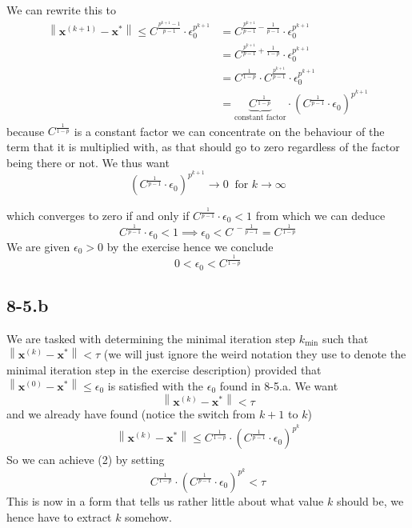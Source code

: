 \documentclass{article}
\newcommand\xk{\mathbf{x}^{\left(k\right)}}
\newcommand\xkn{\mathbf{x}^{\left(k+1\right)}}
\newcommand\xstar{\mathbf{x}^{*}}
\newcommand\xz{\mathbf{x}^{\left(0\right)}}
\begin{document}
\pagebreak

\noindent We can rewrite this to 
\begin{align*}
    \left\lVert \xkn - \xstar \right\rVert   \leq C^{\frac{p^{k+1}-1}{p-1}} \cdot \epsilon_{0}^{p^{k+1}} &= C^{\frac{p^{k+1}}{p-1} - \frac{1}{p-1}} \cdot \epsilon_{0}^{p^{k+1}} \\
    &=C^{\frac{p^{k+1}}{p-1} + \frac{1}{1-p}} \cdot \epsilon_{0}^{p^{k+1}} \\
    &= C^{\frac{1}{1-p}} \cdot C^{\frac{p^{k+1}}{p-1}}\cdot \epsilon_{0}^{p^{k+1}} \\
    &= \underbrace{C^{\frac{1}{1-p}}}_{\text{constant factor}} \cdot \left(C^{\frac{1}{p-1}}\cdot \epsilon_{0}\right)^{p^{k+1}}
\end{align*}
because $C^{\frac{1}{1-p}}$ is a constant factor we can concentrate on the behaviour of the term that it is multiplied with, as that should go to zero regardless of the factor being there or not. We thus want 
\begin{equation*}
    \left(C^{\frac{1}{p-1}}\cdot \epsilon_{0}\right)^{p^{k+1}} \to 0 \:\text{ for } k \to \infty 
\end{equation*}

\noindent which converges to zero if and only if $C^{\frac{1}{p-1}}\cdot \epsilon_{0} < 1$ from which we can deduce
\begin{equation*}
   C^{\frac{1}{p-1}}\cdot \epsilon_{0} < 1 \implies  \epsilon_{0} < C^{\:-\frac{1}{p-1}} = C^{\frac{1}{1-p}}
\end{equation*}
We are given $\epsilon_{0} > 0$ by the exercise hence we conclude
\begin{equation*}
    0 < \epsilon_{0} < C^{\frac{1}{1-p}}
\end{equation*}
\subsection*{8-5.b}
We are tasked with determining the minimal iteration step $k_{\text{min}}$ such that $\left\lVert \xk - \xstar\right\rVert < \tau$ (we will just ignore the weird notation they use to denote the minimal iteration step in the exercise description) provided that $\left\lVert  \xz -\xstar\right\rVert \leq \epsilon_{0}$ is satisfied with the $\epsilon_{0}$ found in 8-5.a. We want 
\begin{equation}
    \left\lVert \xk - \xstar\right\rVert < \tau
\end{equation}
and we already have found (notice the switch from $k+1$ to $k$)
\begin{align*}
    \left\lVert \xk - \xstar \right\rVert   \leq C^{\frac{1}{1-p}} \cdot \left(C^{\frac{1}{p-1}}\cdot \epsilon_{0}\right)^{p^{k}}
\end{align*}
So we can achieve (2) by setting
\begin{equation*}
    C^{\frac{1}{1-p}} \cdot \left(C^{\frac{1}{p-1}}\cdot \epsilon_{0}\right)^{p^{k}} < \tau
\end{equation*}
This is now in a form that tells us rather little about what value $k$ should be, we hence have to extract $k$ somehow. 
\end{document}
